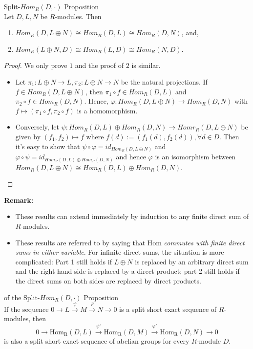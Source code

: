\begin{proposition}{Split-$Hom_R(D,\cdot)$ Proposition}\\
Let $D,L,N$ be $R$-modules. Then
\begin{enumerate}
    \item $Hom_R(D, L \oplus N) \cong Hom_R(D,L) \cong Hom_R(D,N)$, and,
    \item $Hom_R (L \oplus N ,D) \cong Hom_R(L,D) \cong Hom_R(N,D)$.
\end{enumerate}
\end{proposition}

\begin{proof}
    We only prove $1$ and the proof of $2$ is similar.
    \begin{itemize}
        \item Let $\pi_1: L \oplus N \to L, \pi_2 :L \oplus N \to N$ be the natural projections. If $f\in Hom_R(D,L \oplus N)$, then $\pi_1 \circ f \in Hom_R(D,L) $ and $ \pi_2 \circ f\in Hom_R(D,N)$. Hence, $\varphi: Hom_R(D, L\oplus N) \to Hom_R(D,N)$ with $f \mapsto (\pi _1 \circ f, \pi_2 \circ f)$ is a homomorphism.

        \item Conversely, let $\psi: Hom_R(D,L) \oplus Hom_R(D,N) \to Homr_R(D ,L\oplus N)$ be given by $(f_1,f_2) \mapsto f$ where $f(d) := (f_1(d) ,f_2(d)), \forall d\in D$. Then it's easy to show that $\psi \circ \varphi =id_{Hom_R(D ,L\oplus N)}$ and $\varphi \circ \psi =id_{Hom_R(D,L) \oplus Hom_R(D,N)}$ and hence $\varphi$ is an isomorphism between $Hom_R(D, L\oplus N) \cong Hom_R(D,L) \oplus Hom_R(D,N)$.
    \end{itemize}
\end{proof}

\noindent\textbf{Remark:} \begin{itemize}
    \item These results can extend immediately by induction to any finite direct sum of $R$-modules.

    \item These results are referred to by saying that Hom \textit{commutes with finite direct sums in either variable}. For infinite direct sums, the situation is more complicated: Part 1 still holds if $L \oplus N$ is replaced by an arbitrary direct sum and the right hand side is replaced by a direct product; part 2 still holds if the direct sums on both sides are replaced by direct products.
\end{itemize}

\begin{corollary}{of the Split-$Hom_R(D,\cdot)$ Proposition}\\
If the sequence $0 \to L \overset{\psi}{\to} M \overset{\varphi}{\to} N \to 0$ is a split short exact sequence of $R$-modules, then
$$0 \to \text{Hom}_\text{R} (D,L) \overset{\psi'}{\to} \text{Hom}_\text{R} (D,M) \overset{\varphi'}{\to} \text{Hom}_\text{R} (D,N) \to 0$$
is also a split short exact sequence of abelian groups for every $R$-module $D$.
\end{corollary}

